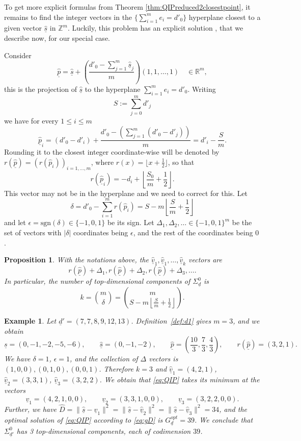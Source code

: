 \documentclass[a4paper]{amsart}
\newcommand{\R}{\mathbb{R}}
\newcommand{\Z}{\mathbb{Z}}
\newcommand{\us}{\underline{s}}
\newcommand{\ud}{\underline{d}}
\newcommand{\uv}{\underline{v}}
\newcommand{\up}{\underline{p}}
\newtheorem{prop}[thm]{Proposition}
\theoremstyle{plain}
\newtheorem{example}[thm]{Example}
\begin{document}
To get more explicit formulas from Theorem \ref{thm:QIPreduced2closestpoint}, it remains to find the integer vectors in the $\{\sum_{i=1}^m e_i=d'_0\}$ hyperplane closest to a given vector $\hat{\us}$ in $\Z^m$. Luckily, this problem has an explicit solution \cite[Ch.~20]{ConwaySloane}, that we describe now, for our special case.

Consider 
\[
\hat{\up} =\hat{\us} + \left( \frac{d'_0-\sum_{j=1}^m \hat{\us}_j}{m} \right)(1,1,\ldots,1)\quad \in \R^m,
\]
this is the projection of $\hat{\us}$ to the hyperplane $\sum_{i=1}^m\! e_i=d'_0$. Writing
\[
S:= \sum_{j=0}^m d'_j
\]
we have for every $1\leq i\leq m$
\[
\hat{\up}_i =(d'_0-d'_i)+\frac{d'_0-\left(\sum_{j=1}^m(d'_0-d'_j)\right)}{m} =d'_i-\frac{S}{m}.
\]
Rounding it to the closest integer coordinate-wise will be denoted by $r(\hat{\up})=(r(\hat{p}_i))_{i=1,\ldots,m}$, 
where $r(x)=\lfloor x+\frac12 \rfloor$, so that
\[
r(\hat{\up}_i)=-d_i+ \left\lfloor \frac{S_0}{m}+\frac{1}{2}\right\rfloor.
\]
This vector may not be in the hyperplane and we need to correct for this. Let 
\begin{equation}\label{eqn:delta}
    \delta=d'_0-\sum_{i=1}^m r(\hat{p}_i)=S-m\left\lfloor \frac{S}{m}+\frac{1}{2}\right\rfloor
\end{equation}
and let $\epsilon=\mathrm{sgn}(\delta) \in \{-1,0,1\}$ be its sign. Let
$\Delta_1,\Delta_2,\ldots \in \{-1,0,1\}^m$ be the set of vectors with $|\delta|$ coordinates being $\epsilon$, and the rest of the coordinates being $0$. 

\begin{prop}{\cite[Ch.~20]{ConwaySloane}}
    With the notations above, the $\hat{\uv}_1, \hat{\uv}_1, \ldots,\hat{\uv}_k$ vectors are 
\[
r(\hat{\up})+\Delta_1, r(\hat{\up})+\Delta_2, r(\hat{\up})+\Delta_3, \ldots.
\]
In particular, the number of top-dimensional components of $\Sigma^0_{\ud}$ is
\begin{equation}\label{eqn:number_top_comp}
    k=\binom{m}{\delta}=\binom{m}{S-m\left\lfloor \frac{S}{m}+\frac{1}{2}\right\rfloor}.
\end{equation}
\end{prop}

\begin{example} \rm \label{ex:closestpoint}
Let $\ud'=(7,7,8,9,12,13)$. Definition~\ref{def:d1} gives $m=3$, and we obtain
\[
\us=(0,-1,-2,-5,-6), \qquad 
\hat{\us}=(0,-1,-2), \qquad
\hat{\up}=\left(\frac{10}{3},\frac{7}{3},\frac{4}{3}\right),
\qquad
r(\hat{\up})=(3,2,1).
\]
We have $\delta=1$, $\epsilon=1$, and the collection of $\Delta$ vectors is
$(1,0,0), (0,1,0), (0,0,1)$.
Therefore $k=3$ and 
$\hat{\uv}_1=(4,2,1)$, $\hat{\uv}_2=(3,3,1)$, $\hat{\uv}_3=(3,2,2)$.
We obtain that \eqref{eq:QIP} takes its minimum at the vectors
\[
\uv_1=(4,2,1,0,0), \qquad
\uv_2=(3,3,1,0,0), \qquad
\uv_3=(3,2,2,0,0).
\]
Further, we have $\hat{D}=\|\hat{\us}-\hat{\uv}_1\|^2=\|\hat{\us}-\hat{\uv}_2\|^2=\|\hat{\us}-\hat{\uv}_3\|^2=34$, and the optimal solution of \eqref{eq:QIP} according to \eqref{eq:gD} is $G_{\ud}^{opt}=39$. We conclude that $\Sigma^0_{\ud'}$ has 3 top-dimensional components, each of codimension $39$.
\end{example}
\end{document}
